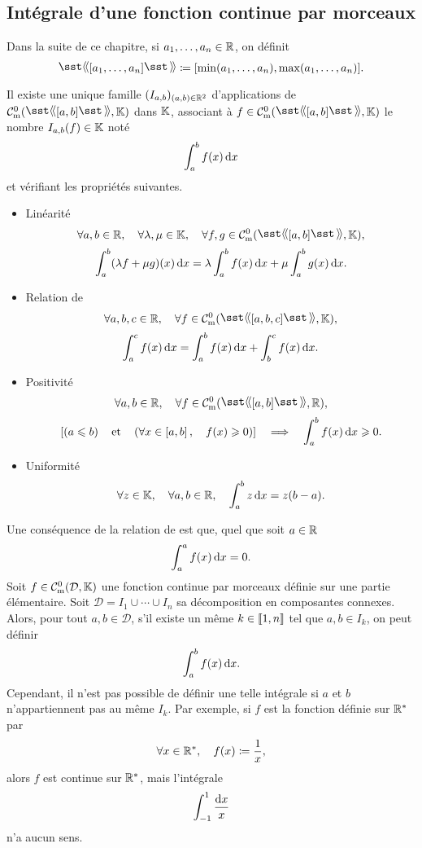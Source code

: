 \documentclass{magnolia}
\begin{document}
\subsection{Intégrale d'une fonction continue par morceaux}

Dans la suite de ce chapitre, si $a_1,\ldots,a_n\in\mathbb{R}$, on définit
  \[\text{\og$[a_1,\ldots,a_n]$\fg}\defeq[\min(a_1,\ldots,a_n),\max(a_1,\ldots,a_n)].\]

\begin{definition}[utile=3]
Il existe une unique famille $(I_{a,b})_{(a,b)\in\mathbb{R}^2}$ d'applications de $\mathcal{C}_{{\rm m}}^0(\text{\og$\interf{a}{b}$\fg},\K)$ dans $\mathbb{K}$, associant
à $f\in\mathcal{C}_{{\rm m}}^0(\text{\og$\interf{a}{b}$\fg},\K)$ le nombre $I_{a,b}(f)\in\mathbb{K}$ noté
\[\int_{a}^{b} f(x)\,\text{d}x\]
et vérifiant les propriétés suivantes.
\begin{itemize}
\item Linéarité
\[\forall a,b\in\R \qsep \forall \lambda, \mu\in\K \qsep \forall f,g\in\mathcal{C}_{{\rm m}}^0(\text{\og$\interf{a}{b}$\fg},\K),\]
\[\int_{a}^{b} (\lambda f+\mu g)(x)\,\text{d}x=\lambda\int_{a}^{b} f(x)\,\text{d}x+\mu\int_{a}^{b} g(x)\,\text{d}x.\]
\item Relation de 
\[\forall a, b, c\in\R \qsep \forall f\in\mathcal{C}_{{\rm m}}^0(\text{\og$[a,b,c]$\fg},\K),\]
\[\int_{a}^{c} f(x)\,\text{d}x=\int_{a}^{b} f(x)\,\text{d}x + \int_{b}^{c} f(x)\,\text{d}x.\]
\item Positivité
\[\forall a,b\in\R \qsep \forall f\in\mathcal{C}_{{\rm m}}^0(\text{\og$\interf{a}{b}$\fg},\R),\]%
\[\left[\left(a \leqslant b\right) \quad\text{et}\quad \left(\forall x\in\left[a,b\right] ,\quad f(x)\geqslant 0\right)\right] \quad\Longrightarrow\quad
  \int_{a}^{b} f(x)\,\text{d}x\geqslant 0.\]
\item Uniformité
\[\forall z\in\mathbb{K} ,\quad \forall a,b\in\mathbb{R} ,\quad \int_{a}^{b} z\,\text{d}x=z(b-a).\]
\end{itemize}
\end{definition}

\begin{remarques}
\remarque Une conséquence de la relation de  est que, quel que soit $a\in\mathbb{R}$
  \[\int_{a}^{a} f(x)\,\text{d}x=0.\]
\remarque Soit $f\in\mathcal{C}_{{\rm m}}^0(\mathcal{D},\mathbb{K})$ une fonction continue par morceaux
  définie sur une partie élémentaire. Soit
  $\mathcal{D}=I_1 \cup \cdots \cup I_n$ sa décomposition en composantes connexes.
  Alors, pour tout $a,b\in\mathcal{D}$, s'il existe un même $k\in\left\llbracket 1,n\right\rrbracket$ tel que
  $a,b\in I_k$, on peut définir
  \[\int_{a}^{b} f(x)\,\text{d}x.\]
  Cependant, il n'est pas possible de définir une telle intégrale si $a$ et $b$ n'appartiennent pas au même $I_k$. Par exemple, si $f$ est la fonction définie sur ${\mathbb{R}^*}$ par
\[\forall x\in{\mathbb{R}^*} ,\quad f(x)\coloneqq\frac{1}{x},\]
alors $f$ est continue sur ${\mathbb{R}^*}$, mais l'intégrale
\[\int_{-1}^{1} \frac{\text{d}x}{x}\]
n'a aucun sens.
\end{remarques}
\end{document}
